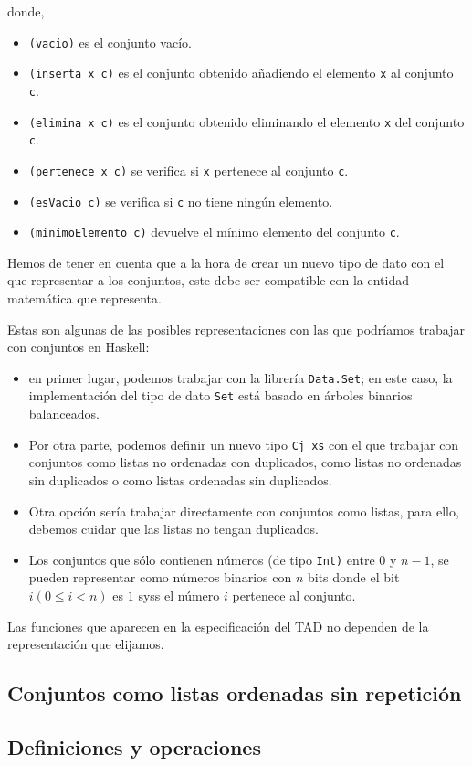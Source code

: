 donde,

\begin{itemize}
\item \texttt{(vacio)} es el conjunto vacío.
\item \texttt{(inserta x c)} es el conjunto obtenido añadiendo el      
      elemento \texttt{x} al conjunto \texttt{c}.
\item \texttt{(elimina x c)} es el conjunto obtenido eliminando el
      elemento \texttt{x} del conjunto \texttt{c}.
\item \texttt{(pertenece x c)} se verifica si \texttt{x} pertenece al
      conjunto \texttt{c}.
\item \texttt{(esVacio c)} se verifica si \texttt{c} no tiene ningún
      elemento.
\item \texttt{(minimoElemento c)} devuelve el mínimo elemento del      
      conjunto \texttt{c}.
\end{itemize}

Hemos de tener en cuenta que a la hora de crear un nuevo tipo de dato 
con el que representar a los conjuntos, este debe ser compatible con 
la entidad matemática que representa.

Estas son algunas de las posibles representaciones con las que podríamos
trabajar con conjuntos en Haskell:

\begin{itemize}
  \item en primer lugar, podemos trabajar con la librería  
        \texttt{Data.Set}; en este caso, la implementación del tipo de 
        dato \texttt{Set} está basado en árboles binarios balanceados.
  \item Por otra parte, podemos definir un nuevo tipo \texttt{Cj xs} con  
        el que trabajar con conjuntos como listas no ordenadas con        
        duplicados, como listas no ordenadas sin duplicados o como        
        listas ordenadas sin duplicados.
  \item Otra opción sería trabajar directamente con conjuntos como  
        listas, para ello, debemos cuidar que las listas no tengan        
        duplicados.
  \item Los conjuntos que sólo contienen números (de tipo \texttt{Int)} 
        entre $0$ y $n-1$, se pueden representar como números binarios 
        con $n$ bits donde el bit $i (0 ≤ i < n)$ es $1$ syss el número
        $i$ pertenece al conjunto.
\end{itemize}

\begin{nota}
  Las funciones que aparecen en la especificación del TAD no dependen 
  de la representación que elijamos.
\end{nota}

\subsection{Conjuntos como listas ordenadas sin repetición}


\subsection{Definiciones y operaciones}

